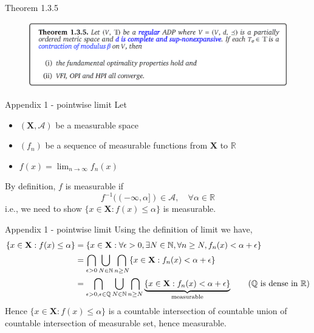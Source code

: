 \documentclass[aspectratio=169]{beamer} %
\begin{document}
\begin{frame}{Theorem 1.3.5}
    \begin{figure}
        \centering
        \includegraphics[width=1\linewidth]{Dynamic Programming/DP2/Chapter 4/4.2.4.1 Job Search with Separation/thm135.png}
    \end{figure}
\end{frame}
\begin{frame}{Appendix 1 - pointwise limit}\label{app:pointwise}
    Let 
    \begin{itemize}
        \item $(\mathbf{X},\mathcal{A})$ be a measurable space
        \item $(f_n)$ be a sequence of measurable functions from $\mathbf{X}$ to $\mathbb{R}$
        \item $f(x) = \lim_{n\to\infty} f_n(x)$
    \end{itemize}
    By definition, $f$ is measurable if
    $$
    f^{-1}((-\infty, \alpha])\in\mathcal{A},\quad \forall \alpha\in\mathbb{R}
    $$
    i.e., we need to show $\{x\in \mathbf{X}: f(x)\le \alpha\}$ is measurable. 
\end{frame}

\begin{frame}{Appendix 1 - pointwise limit}
Using the definition of limit we have,
\begin{align*}
    \{x\in \mathbf{X}: f(x)\le \alpha\} &= \{x\in \mathbf{X}: \forall\epsilon>0,\exists N\in\mathbb{N}, \forall n\ge N, f_n(x)<\alpha+\epsilon\}\\
    &= \bigcap_{\epsilon>0}\bigcup_{N\in\mathbb{N}}\bigcap_{n\ge N} \{x\in \mathbf{X}: f_n(x)<\alpha+\epsilon\}\\
    &= \bigcap_{\epsilon>0,\epsilon\in \mathbb{Q}}\bigcup_{N\in\mathbb{N}}\bigcap_{n\ge N}\underbrace{\{x\in \mathbf{X}: f_n(x)<\alpha+\epsilon\}}_{\text{measurable}}\tag{$\mathbb{Q}$ is dense in $\mathbb{R}$}\\
\end{align*}
Hence $\{x\in \mathbf{X}: f(x)\le \alpha\}$ is a countable intersection of countable union of countable intersection of measurable set, hence measurable.
    
\end{frame}
\end{document}
